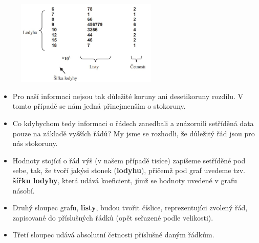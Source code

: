 \begin{itemize}
\begin{itemize}
\begin{table}[H]
\begin{tabular}{|l|}
	\end{tabular}
\end{table}
				\begin{figure}[H]
				\centering
				\includegraphics[width=0.6\textwidth]{assets/13_cislicovy_hist}
				\end{figure}
		\begin{itemize}
		 \item Pro naší informaci nejsou tak důležité koruny ani desetikoruny rozdílu. V tomto případě se nám jedná přinejmenším o stokoruny.
		 \item Co kdybychom tedy informaci o  řádech zanedbali a znázornili setříděná data pouze na základě vyšších řádů? My jsme se rozhodli, že důležitý řád jsou pro nás stokoruny.
		 \item Hodnoty stojící o řád výš (v našem případě tisíce) zapíšeme setříděné pod sebe, tak, že tvoří jakýsi stonek (\textbf{lodyhu}), přičemž pod graf uvedeme tzv. \textbf{šířku lodyhy}, která udává koeficient, jímž se hodnoty uvedené v grafu násobí.
		 \item Druhý sloupec grafu, \textbf{listy}, budou tvořit číslice, reprezentujíci zvolený  řád, zapisované do příslušných řádků (opět seřazené podle velikosti).
		 \item Třetí sloupec udává absolutní četnosti příslušné daným řádkům.
		\end{itemize}
	\end{itemize}
\end{itemize}
